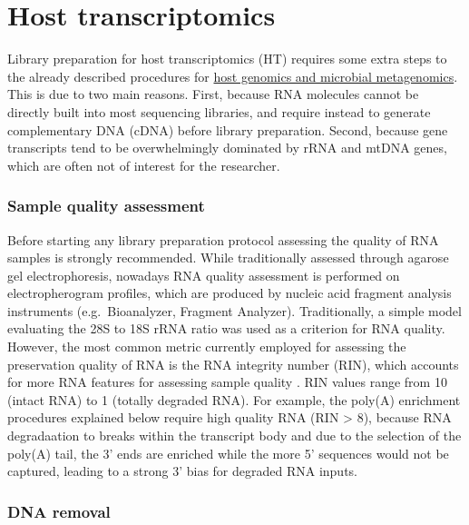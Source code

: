 \documentclass[
]{book}
\begin{document}
\hypertarget{library-host-transcriptomics}{%
\section{Host transcriptomics}\label{library-host-transcriptomics}}

Library preparation for host transcriptomics (HT) requires some extra steps to the already described procedures for \protect\hyperlink{ux5cux23library-meta-genomics}{host genomics and microbial metagenomics}. This is due to two main reasons. First, because RNA molecules cannot be directly built into most sequencing libraries, and require instead to generate complementary DNA (cDNA) before library preparation. Second, because gene transcripts tend to be overwhelmingly dominated by rRNA and mtDNA genes, which are often not of interest for the researcher.

\hypertarget{rrna-sample-quality-assessment}{%
\subsubsection*{Sample quality assessment}\label{rrna-sample-quality-assessment}}

Before starting any library preparation protocol assessing the quality of RNA samples is strongly recommended. While traditionally assessed through agarose gel electrophoresis, nowadays RNA quality assessment is performed on electropherogram profiles, which are produced by nucleic acid fragment analysis instruments (e.g.~Bioanalyzer, Fragment Analyzer). Traditionally, a simple model evaluating the 28S to 18S rRNA ratio was used as a criterion for RNA quality. However, the most common metric currently employed for assessing the preservation quality of RNA is the RNA integrity number (RIN), which accounts for more RNA features for assessing sample quality \citep{Schroeder2006-dn}. RIN values range from 10 (intact RNA) to 1 (totally degraded RNA). For example, the poly(A) enrichment procedures explained below require high quality RNA (RIN \textgreater{} 8), because RNA degradaation to breaks within the transcript body and due to the selection of the poly(A) tail, the 3' ends are enriched while the more 5' sequences would not be captured, leading to a strong 3' bias for degraded RNA inputs.

\hypertarget{DNA-removal}{%
\subsubsection*{DNA removal}\label{DNA-removal}}
\end{document}
